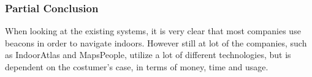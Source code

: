 \subsubsection{Partial Conclusion}
When looking at the existing systems, it is very clear that most companies use beacons in order to navigate indoors. However still at lot of the companies, such as IndoorAtlas and MapsPeople, utilize a lot of different technologies, but is dependent on the costumer's case, in terms of money, time and usage. 


